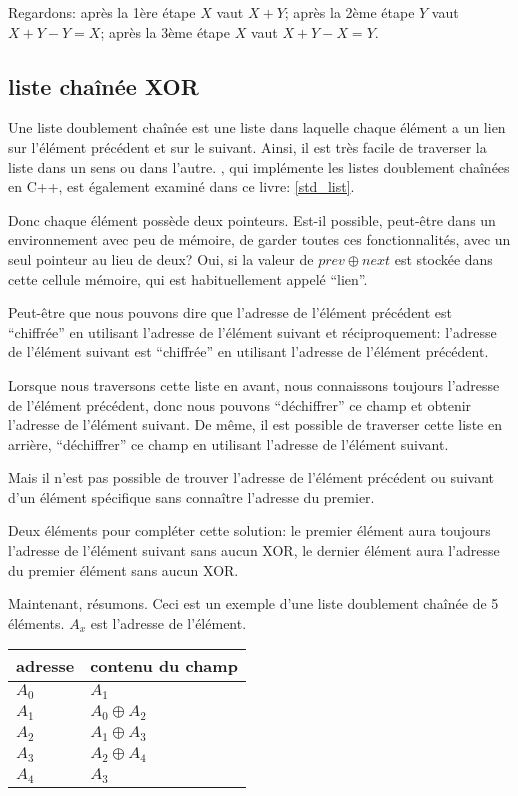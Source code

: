 Regardons:
après la 1ère étape $X$ vaut $X+Y$;
après la 2ème étape $Y$ vaut $X+Y-Y=X$;
après la 3ème étape $X$ vaut $X+Y-X=Y$.

\subsection{liste chaînée XOR}

Une liste doublement chaînée est une liste dans laquelle chaque élément a un lien
sur l'élément précédent et sur le suivant.
Ainsi, il est très facile de traverser la liste dans un sens ou dans l'autre.
, qui implémente les listes doublement chaînées en C++, est également
examiné dans ce livre: \ref{std_list}.

Donc chaque élément possède deux pointeurs.
Est-il possible, peut-être dans un environnement avec peu de mémoire, de garder toutes
ces fonctionnalités, avec un seul pointeur au lieu de deux?
Oui, si la valeur de $prev \oplus next$ est stockée dans cette cellule mémoire, qui
est habituellement appelé ``lien''.

Peut-être que nous pouvons dire que l'adresse de l'élément précédent est ``chiffrée''
en utilisant l'adresse de l'élément suivant et réciproquement:
l'adresse de l'élément suivant est ``chiffrée'' en utilisant l'adresse de l'élément
précédent.

Lorsque nous traversons cette liste en avant, nous connaissons toujours l'adresse
de l'élément précédent, donc nous pouvons ``déchiffrer'' ce champ et obtenir l'adresse
de l'élément suivant.
De même, il est possible de traverser cette liste en arrière, ``déchiffrer'' ce champ
en utilisant l'adresse de l'élément suivant.

Mais il n'est pas possible de trouver l'adresse de l'élément précédent ou suivant
d'un élément spécifique sans connaître l'adresse du premier.

Deux éléments pour compléter cette solution: le premier élément aura toujours l'adresse
de l'élément suivant sans aucun XOR, le dernier élément aura l'adresse du premier
élément sans aucun XOR.

Maintenant, résumons. Ceci est un exemple d'une liste doublement chaînée de 5 éléments.
$A_x$ est l'adresse de l'élément.

\begin{center}
\begin{tabular}{ | l | l | }
	\hline
	\HeaderColor adresse & \HeaderColor contenu du champ \IT{link} \\
	\hline
	$A_0$ & $A_1$ \\
	\hline
	$A_1$ & $A_0 \oplus A_2$ \\
	\hline
	$A_2$ & $A_1 \oplus A_3$ \\
	\hline
	$A_3$ & $A_2 \oplus A_4$ \\
	\hline
	$A_4$ & $A_3$ \\
	\hline
\end{tabular}
\end{center}

